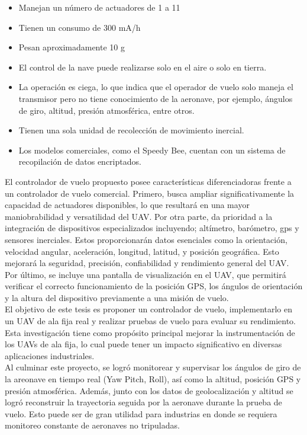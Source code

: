 \begin{itemize}
    \item Manejan un número de actuadores de 1 a 11
    \item Tienen un consumo de 300 mA/h
    \item Pesan aproximadamente 10 g
    \item El control de la nave puede realizarse solo en el aire o solo en tierra.
    \item La operación es ciega, lo que indica que el operador de vuelo solo maneja el transmisor pero no tiene conocimiento de la aeronave, por ejemplo, ángulos de giro, altitud, presión atmosférica, entre otros.
    \item Tienen una sola unidad de recolección de movimiento inercial.
    \item Los modelos comerciales, como el Speedy Bee, cuentan con un sistema de recopilación de datos encriptados.
\end{itemize}


\vspace{5 px}
El controlador de vuelo propuesto posee características diferenciadoras frente a un controlador de vuelo comercial. Primero, busca ampliar significativamente la capacidad de actuadores disponibles, lo que resultará en una mayor maniobrabilidad y versatilidad del UAV. Por otra parte, da prioridad a la integración de dispositivos especializados incluyendo; altímetro, barómetro, gps y sensores inerciales. Estos proporcionarán datos esenciales como la orientación, velocidad angular, aceleración, longitud, latitud,  y posición geográfica. Esto mejorará la seguridad, precisión, confiabilidad y rendimiento general del UAV. Por último, se incluye una pantalla de visualización en el UAV, que permitirá verificar el correcto funcionamiento de la posición GPS, los ángulos de orientación y la altura del dispositivo previamente a una misión de vuelo.\\

El objetivo de este tesis es proponer un controlador de vuelo, implementarlo en un UAV de ala fija real y realizar pruebas de vuelo para evaluar su rendimiento. Esta investigación tiene como propósito principal mejorar la instrumentación de los UAVs de ala fija, lo cual puede tener un impacto significativo en diversas aplicaciones industriales.\\

Al culminar este proyecto, se logró monitorear y supervisar los ángulos de giro de la areonave en tiempo real (Yaw Pitch, Roll), así como la altitud, posición GPS y presión atmosférica. Además, junto con los datos de geolocalización y altitud se logró reconstruir la trayectoria seguida por la aeronave durante la prueba de vuelo. Esto puede ser de gran utilidad para industrias en donde se requiera monitoreo constante de aeronaves no tripuladas.

